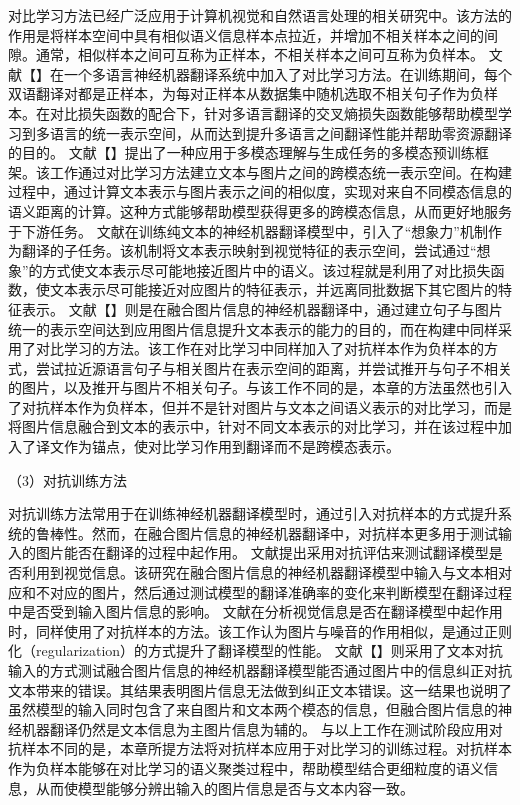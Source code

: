 对比学习方法已经广泛应用于计算机视觉和自然语言处理的相关研究中。该方法的作用是将样本空间中具有相似语义信息样本点拉近，并增加不相关样本之间的间隙。通常，相似样本之间可互称为正样本，不相关样本之间可互称为负样本。
文献【】在一个多语言神经机器翻译系统中加入了对比学习方法。在训练期间，每个双语翻译对都是正样本，为每对正样本从数据集中随机选取不相关句子作为负样本。在对比损失函数的配合下，针对多语言翻译的交叉熵损失函数能够帮助模型学习到多语言的统一表示空间，从而达到提升多语言之间翻译性能并帮助零资源翻译的目的。
文献【】提出了一种应用于多模态理解与生成任务的多模态预训练框架。该工作通过对比学习方法建立文本与图片之间的跨模态统一表示空间。在构建过程中，通过计算文本表示与图片表示之间的相似度，实现对来自不同模态信息的语义距离的计算。这种方式能够帮助模型获得更多的跨模态信息，从而更好地服务于下游任务。
文献\cite{37_elliott-kadar-2017-imagination}在训练纯文本的神经机器翻译模型中，引入了“想象力”机制作为翻译的子任务。该机制将文本表示映射到视觉特征的表示空间，尝试通过“想象”的方式使文本表示尽可能地接近图片中的语义。该过程就是利用了对比损失函数，使文本表示尽可能接近对应图片的特征表示，并远离同批数据下其它图片的特征表示。
文献【】则是在融合图片信息的神经机器翻译中，通过建立句子与图片统一的表示空间达到应用图片信息提升文本表示的能力的目的，而在构建中同样采用了对比学习的方法。该工作在对比学习中同样加入了对抗样本作为负样本的方式，尝试拉近源语言句子与相关图片在表示空间的距离，并尝试推开与句子不相关的图片，以及推开与图片不相关句子。与该工作不同的是，本章的方法虽然也引入了对抗样本作为负样本，但并不是针对图片与文本之间语义表示的对比学习，而是将图片信息融合到文本的表示中，针对不同文本表示的对比学习，并在该过程中加入了译文作为锚点，使对比学习作用到翻译而不是跨模态表示。

{\sffamily （3）对抗训练方法}

对抗训练方法常用于在训练神经机器翻译模型时，通过引入对抗样本的方式提升系统的鲁棒性。然而，在融合图片信息的神经机器翻译中，对抗样本更多用于测试输入的图片能否在翻译的过程中起作用。
文献\cite{23_elliott-2018-adversarial}提出采用对抗评估来测试翻译模型是否利用到视觉信息。该研究在融合图片信息的神经机器翻译模型中输入与文本相对应和不对应的图片，然后通过测试模型的翻译准确率的变化来判断模型在翻译过程中是否受到输入图片信息的影响。
文献\cite{20_wu-etal-2021-good,22_li-etal-2021-vision}在分析视觉信息是否在翻译模型中起作用时，同样使用了对抗样本的方法。该工作认为图片与噪音的作用相似，是通过正则化（regularization）的方式提升了翻译模型的性能。
文献【】则采用了文本对抗输入的方式测试融合图片信息的神经机器翻译模型能否通过图片中的信息纠正对抗文本带来的错误。其结果表明图片信息无法做到纠正文本错误。这一结果也说明了虽然模型的输入同时包含了来自图片和文本两个模态的信息，但融合图片信息的神经机器翻译仍然是文本信息为主图片信息为辅的。
与以上工作在测试阶段应用对抗样本不同的是，本章所提方法将对抗样本应用于对比学习的训练过程。对抗样本作为负样本能够在对比学习的语义聚类过程中，帮助模型结合更细粒度的语义信息，从而使模型能够分辨出输入的图片信息是否与文本内容一致。